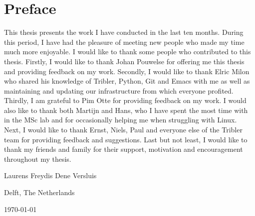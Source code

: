 \chapter*{Preface}
This thesis presents the work I have conducted in the last ten months.
During this period, I have had the pleasure of meeting new people who made my time much more enjoyable.
I would like to thank some people who contributed to this thesis.
Firstly, I would like to thank Johan Pouwelse for offering me this thesis and providing feedback on my work.
Secondly, I would like to thank Elric Milon who shared his knowledge of Tribler, Python, Git and Emacs with me as well as maintaining and updating our infrastructure from which everyone profited.
Thirdly, I am grateful to Pim Otte for providing feedback on my work.
I would also like to thank both Martijn and Hans, who I have spent the most time with in the MSc lab and for occasionally helping me when struggling with Linux.
Next, I would like to thank Ernst, Niels, Paul and everyone else of the Tribler team for providing feedback and suggestions.
Last but not least, I would like to thank my friends and family for their support, motivation and encouragement throughout my thesis.

\vspace{1\baselineskip}

\noindent
Laurens Freydis Dene Versluis

\vspace{1\baselineskip}

\noindent
Delft, The Netherlands

\noindent
\today